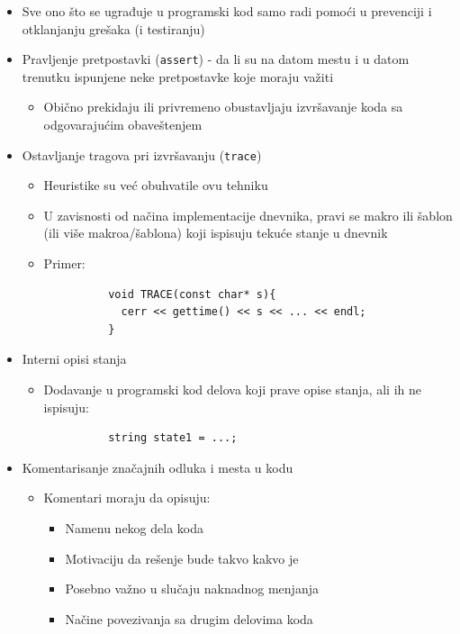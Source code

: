 \documentclass[a4paper]{article}
\begin{document}
  \begin{itemize}
    \item Sve ono što se ugrađuje u programski kod samo radi pomoći u prevenciji i otklanjanju grešaka (i testiranju)
    \item Pravljenje pretpostavki (\texttt{assert}) - da li su na datom mestu i u datom trenutku ispunjene neke pretpostavke koje moraju važiti
      \begin{itemize}
        \item Obično prekidaju ili privremeno obustavljaju izvršavanje koda sa odgovarajućim obaveštenjem
      \end{itemize}
    \item Ostavljanje tragova pri izvršavanju (\texttt{trace})
      \begin{itemize}
        \item Heuristike su već obuhvatile ovu tehniku
        \item U zavisnosti od načina implementacije dnevnika, pravi se makro ili šablon (ili više makroa/šablona) koji ispisuju tekuće stanje u dnevnik
        \item Primer:
          \begin{verbatim}
          void TRACE(const char* s){
            cerr << gettime() << s << ... << endl;
          }
          \end{verbatim}
      \end{itemize}
    \item Interni opisi stanja
      \begin{itemize}
        \item Dodavanje u programski kod delova koji prave opise stanja, ali ih ne ispisuju:
          \begin{verbatim}
          string state1 = ...;
          \end{verbatim}
      \end{itemize}
    \item Komentarisanje značajnih odluka i mesta u kodu
      \begin{itemize}
        \item Komentari moraju da opisuju:
          \begin{itemize}
            \item Namenu nekog dela koda
            \item Motivaciju da rešenje bude takvo kakvo je
            \item Posebno važno u slučaju naknadnog menjanja
            \item Načine povezivanja sa drugim delovima koda

\end{itemize}
\end{itemize}
\end{itemize}
\end{document}
